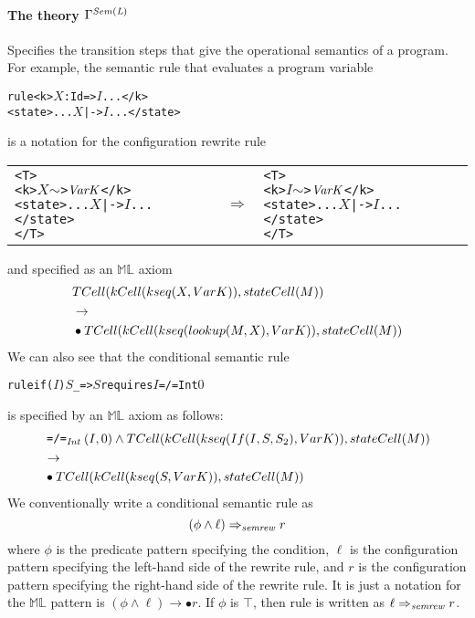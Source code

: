 \documentclass{article}
\theoremstyle{plain}
\theoremstyle{definition}
\newcommand{\ML}{$\mathbb{ML}$\xspace}
\newcommand{\Int}{\ensuremath{\mathit{Int}}}
\newcommand{\DiffInt}{\ensuremath{\mathbin{\texttt{=/=}_\Int}}}
\begin{document}
\paragraph{The theory $\Gamma^{\it Sem(L)}$\\}Specifies the transition steps that give the operational semantics of a program. For example, the semantic rule that evaluates a program variable
\begin{alltt}
    rule <k> \(X\):Id => \(I\) ...</k>
         <state>... \(X\) |-> \(I\) ...</state>
\end{alltt}
is a notation for the configuration rewrite rule
\begin{center}
\begin{tabular}{lcl}
\begin{minipage}{.4\textwidth}\footnotesize
\begin{alltt}
<T>
  <k> \(X\) \(\sim\)>\(\it VarK\) </k>
  <state>... \(X\) |-> \(I\) ...</state>
</T>
\end{alltt}
\end{minipage}
&
$\Rightarrow$
&
\begin{minipage}{.4\textwidth}\footnotesize
\begin{alltt}
<T>
  <k> \(I\) \(\sim\)>\(\it VarK\) </k>
  <state>... \(X\) |-> \(I\) ...</state>
</T>
\end{alltt}
\end{minipage}
\end{tabular}
\end{center}
and specified as an \ML axiom
\begin{align*}\it
&TCell(kCell(kseq(X, VarK)),stateCell(M))\\
&{}\rightarrow{}\\
&\bullet TCell(kCell(kseq(lookup(M, X), VarK)),stateCell(M))   
\end{align*}
We can also see that the conditional semantic rule
\begin{alltt}
    rule if (\(I\)) \(S\) _ => \(S\) requires \(I\) =/=Int \(0\) 
\end{alltt}
is specified by an \ML axiom as follows:
\begin{align*}\it
&\DiffInt(I, 0) \land TCell(kCell(kseq(If(I, S, S_2), VarK)),stateCell(M))\\
&{}\rightarrow{}\\
&\bullet TCell(kCell(kseq(S, VarK)),stateCell(M))   
\end{align*}
We conventionally write a conditional semantic rule as 
\[
(\phi \land \ell) \Rightarrow_{\it semrew} r
\]
where $\phi$ is the predicate pattern specifying the condition, $\ell$ is the configuration pattern specifying the left-hand side of the rewrite rule, and $r$ is the configuration pattern specifying the right-hand side of the rewrite rule. It is just a notation for the \ML pattern is $(\phi \land\ell) \rightarrow\bullet r$.
If $\phi$ is $\top$, then rule is written as $\ell \Rightarrow_{\it semrew} r$.
\end{document}
